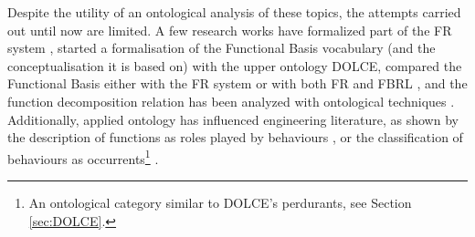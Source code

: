 \documentclass[sw]{iosart2x}
\newcommand{\DOLCE}{\textsc{DOLCE}\xspace} %
\begin{document}

Despite the utility of an ontological analysis of these topics, the attempts carried out until now are limited. 
A few research works have formalized part of the FR system \cite{borgoFormalOntologicalPerspective2009}, started a formalisation of the Functional Basis vocabulary (and the conceptualisation it is based on) with the upper ontology \DOLCE \cite{borgoOntologicalRepresentationFunctional2009, borgoFormalizationFunctionsOperations2011}, compared the Functional Basis either with the FR system \cite{garbaczTwoOntologydrivenFormalisations2011} or with both FR and FBRL \cite{kitamuraDeepSemanticMapping2008}, and the function decomposition relation has been analyzed with ontological techniques \cite{vermaasFunctionalDecompositionMereology2009a,vermaasFormalImpossibilityAnalysing2013}. 
Additionally, applied ontology has influenced engineering literature, as shown by the description of functions as roles played by behaviours \cite{mizoguchiUnifiedDefinitionFunction2012, kitamuraOntologicalModelDevice2006, chandrasekaranFunctionDeviceRepresentation2000}, or the classification of behaviours as occurrents\footnote{An ontological category similar to \DOLCE's perdurants, see Section \ref{sec:DOLCE}.}  \cite{kitamuraOntologicalModelDevice2006}.
\end{document}

